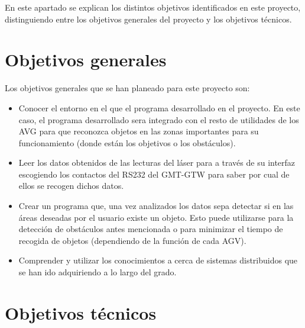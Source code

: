 
En este apartado se explican los distintos objetivos identificados en este proyecto, distinguiendo entre los objetivos generales del proyecto y los objetivos técnicos.

\section{Objetivos generales}

Los objetivos generales que se han planeado para este proyecto son:
\begin{itemize}
	\item Conocer el entorno en el que el programa desarrollado en el proyecto. En este caso, el programa desarrollado sera integrado con el resto de utilidades de los AVG para que reconozca objetos en las zonas importantes para su funcionamiento (donde están los objetivos o los obstáculos).
    \item Leer los datos obtenidos de las lecturas del láser para a través de su interfaz escogiendo los contactos del RS232 del GMT-GTW para saber por cual de ellos se recogen dichos datos.
    \item Crear un programa que, una vez analizados los datos sepa detectar si en las áreas deseadas por el usuario existe un objeto. Esto puede utilizarse para la detección de obstáculos antes mencionada o para minimizar el tiempo de recogida de objetos (dependiendo de la función de cada AGV).
    \item Comprender y utilizar los conocimientos a cerca de sistemas distribuidos que se han ido adquiriendo a lo largo del grado.
\end{itemize} 

\section{Objetivos técnicos}

